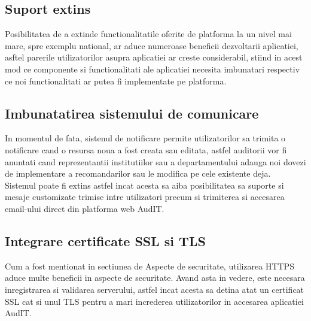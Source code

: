\subsection*{Suport extins}

Posibilitatea de a extinde functionalitatile oferite de platforma la un nivel mai mare, spre exemplu national, ar aduce numeroase beneficii dezvoltarii aplicatiei, asftel parerile utilizatorilor asupra aplicatiei ar creste considerabil, stiind in acest mod ce componente si functionalitati ale aplicatiei necesita imbunatari respectiv ce noi functionalitati ar putea fi implementate pe platforma.


\subsection*{Imbunatatirea sistemului de comunicare}
In momentul de fata, sistenul de notificare permite utilizatorilor sa trimita o notificare cand o resursa noua a fost creata sau editata, astfel auditorii vor fi anuntati cand reprezentantii institutiilor sau a departamentului adauga noi dovezi de implementare a recomandarilor sau le modifica pe cele existente deja. \\
Sistemul poate fi extins astfel incat acesta sa aiba posibilitatea sa suporte si mesaje customizate trimise intre utilizatori precum si trimiterea si accesarea email-ului direct din platforma web AudIT.

\subsection*{Integrare certificate SSL si TLS}

Cum a fost mentionat in sectiunea de Aspecte de securitate, utilizarea HTTPS aduce multe beneficii in aspecte de securitate. Avand asta in vedere, este necesara inregistrarea si validarea serverului, astfel incat acesta sa detina atat un certificat SSL cat si unul TLS pentru a mari increderea utilizatorilor in accesarea aplicatiei AudIT.

